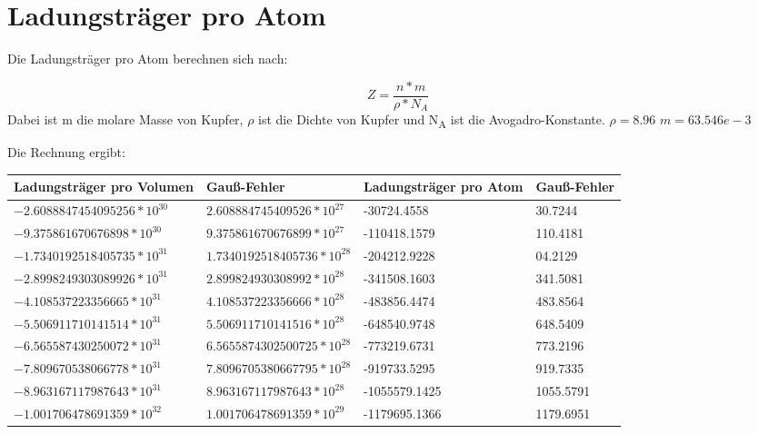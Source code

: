 \documentclass[titlepage=firstcover, captions=tableheading]{scrartcl}
\begin{document}
\section{Ladungsträger pro Atom}

Die Ladungsträger pro Atom berechnen sich nach:

\begin{displaymath} 
    Z= \frac{n*m}{\rho * N_A}
\end{displaymath}
Dabei ist m die molare Masse von Kupfer, $\rho$ ist die Dichte von Kupfer und N\textsubscript{A} ist die Avogadro-Konstante.
$\rho = 8.96$
$m = 63.546e-3$

Die Rechnung ergibt:
\begin{center}
    \begin{tabular}{l @{${}\pm{}$}ll @{${}\pm{}$}l}\\
        \toprule
        Ladungsträger pro Volumen & Gauß-Fehler & Ladungsträger pro Atom & Gauß-Fehler\\
        \midrule
        $-2.6088847454095256*10^{30}$ &  $2.608884745409526 *10^{27} $  &   -30724.4558 &  30.7244\\
        $-9.375861670676898 *10^{30}$  & $9.375861670676899  *10^{27}$    &  -110418.1579 &  110.4181\\
        $-1.7340192518405735*10^{31}$ &  $1.7340192518405736*10^{28} $ &  -204212.9228 &   04.2129   \\   
        $-2.8998249303089926*10^{31}$ &  $2.899824930308992 *10^{28} $  &  -341508.1603 &  341.5081\\
        $-4.108537223356665 *10^{31}$  & $4.108537223356666  *10^{28}$    &  -483856.4474 &   483.8564\\
        $-5.506911710141514 *10^{31}$  & $5.506911710141516  *10^{28}$     &  -648540.9748 &   648.5409\\
        $-6.565587430250072 *10^{31}$  & $6.5655874302500725 *10^{28}$   &  -773219.6731 &   773.2196 \\
        $-7.809670538066778 *10^{31}$  & $7.8096705380667795 *10^{28}$   &  -919733.5295 &    919.7335 \\ 
        $-8.963167117987643 *10^{31}$  & $8.963167117987643  *10^{28}$    &  -1055579.1425 &  1055.5791 \\
        $-1.001706478691359 *10^{32}$  & $1.001706478691359  *10^{29}$   &  -1179695.1366 &  1179.6951 \\
        \bottomrule
    \end{tabular}
\end{center}
\end{document}
